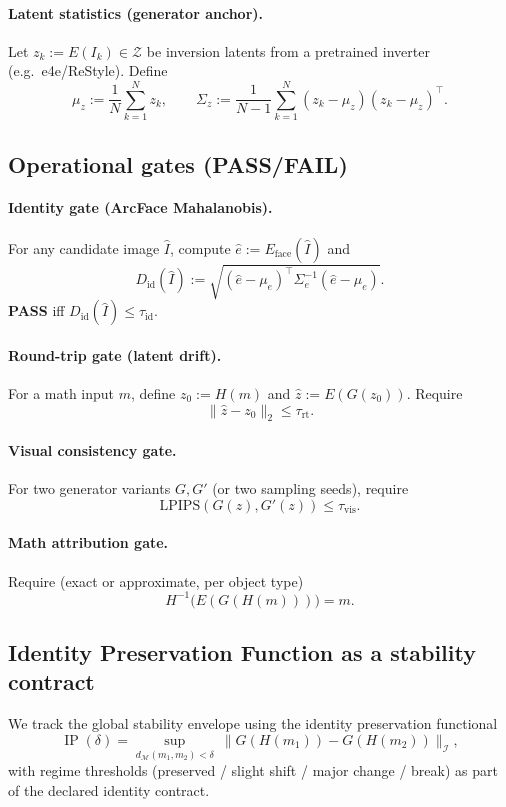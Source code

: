 \documentclass[12pt]{amsart}
\numberwithin{equation}{section}
\newcommand{\cM}{\mathcal{M}}
\newcommand{\cZ}{\mathcal{Z}}
\newcommand{\cI}{\mathcal{I}}
\DeclareMathOperator{\IP}{IP}
\begin{document}
\paragraph{Latent statistics (generator anchor).}
Let $z_k := E(I_k)\in\cZ$ be inversion latents from a pretrained inverter
(e.g.\ e4e/ReStyle). Define
\[
\mu_z := \frac{1}{N}\sum_{k=1}^N z_k,
\qquad
\Sigma_z := \frac{1}{N-1}\sum_{k=1}^N (z_k-\mu_z)(z_k-\mu_z)^\top.
\]

\subsection{Operational gates (PASS/FAIL)}
\paragraph{Identity gate (ArcFace Mahalanobis).}
For any candidate image $\hat I$, compute $\hat e:=E_{\text{face}}(\hat I)$ and
\[
D_{\mathrm{id}}(\hat I)
:=
\sqrt{(\hat e-\mu_e)^\top \Sigma_e^{-1}(\hat e-\mu_e)}.
\]
\textbf{PASS} iff $D_{\mathrm{id}}(\hat I)\le \tau_{\mathrm{id}}$.

\paragraph{Round-trip gate (latent drift).}
For a math input $m$, define $z_0:=H(m)$ and $\hat z := E(G(z_0))$. Require
\[
\| \hat z - z_0 \|_2 \le \tau_{\mathrm{rt}}.
\]

\paragraph{Visual consistency gate.}
For two generator variants $G,G'$ (or two sampling seeds), require
\[
\mathrm{LPIPS}(G(z),G'(z)) \le \tau_{\mathrm{vis}}.
\]

\paragraph{Math attribution gate.}
Require (exact or approximate, per object type)
\[
H^{-1}\big(E(G(H(m)))\big)=m.
\]

\subsection{Identity Preservation Function as a stability contract}
We track the global stability envelope using the identity preservation functional
\[
\IP(\delta)=\sup_{d_{\cM}(m_1,m_2)<\delta}\ \|G(H(m_1)) - G(H(m_2))\|_{\cI},
\]
with regime thresholds (preserved / slight shift / major change / break) as part
of the declared identity contract.
\end{document}
